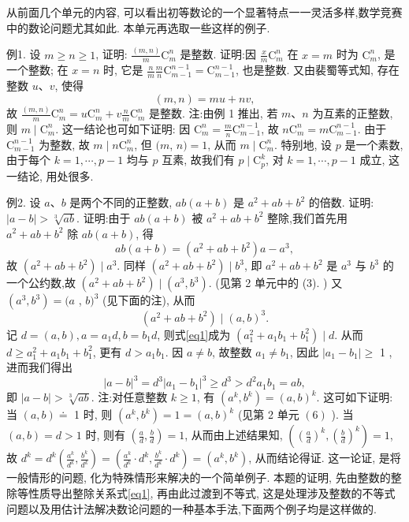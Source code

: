 
从前面几个单元的内容, 可以看出初等数论的一个显著特点一一灵活多样,数学竞赛中的数论问题尤其如此.
本单元再选取一些这样的例子.



例1. 设 $m \geqslant n \geqslant 1$, 证明: $\frac{(m, n)}{m} \mathrm{C}_m^n$ 是整数.
证明:因 $\frac{x}{m} \mathrm{C}_m^n$ 在 $x=m$ 时为 $\mathrm{C}_m^n$, 是一个整数; 在 $x=n$ 时, 它是 $\frac{n}{m} \frac{m}{n} \mathrm{C}_{m-1}^{n-1}=\mathrm{C}_{m-1}^{n-1}$, 也是整数.
又由裴蜀等式知, 存在整数 $u 、 v$, 使得
$$
(m, n)=m u+n v,
$$
故 $\frac{(m, n)}{m} \mathrm{C}_m^n=u \mathrm{C}_m^n+v \frac{n}{m} \mathrm{C}_m^n$ 是整数.
注:由例 1 推出, 若 $m 、 n$ 为互素的正整数,则 $m \mid \mathrm{C}_m^n$. 这一结论也可如下证明: 因 $\mathrm{C}_m^n=\frac{m}{n} \mathrm{C}_{m-1}^{n-1}$, 故 $n \mathrm{C}_m^n=m \mathrm{C}_{m-1}^{n-1}$. 由于 $\mathrm{C}_{m-1}^{n-1}$ 为整数, 故 $m \mid n \mathrm{C}_m^n$, 但 $(m$, $n)=1$, 从而 $m \mid \mathrm{C}_m^n$.
特别地, 设 $p$ 是一个素数, 由于每个 $k=1, \cdots, p-1$ 均与 $p$ 互素, 故我们有 $p \mid \mathrm{C}_p^k$, 对 $k=1, \cdots, p-1$ 成立, 这一结论, 用处很多.



例2. 设 $a 、 b$ 是两个不同的正整数, $a b(a+b)$ 是 $a^2+a b+b^2$ 的倍数.
证明: $|a-b|>\sqrt[3]{a b}$.
证明:由于 $a b(a+b)$ 被 $a^2+a b+b^2$ 整除,我们首先用 $a^2+a b+b^2$ 除 $a b(a+b)$, 得
$$
a b(a+b)=\left(a^2+a b+b^2\right) a-a^3,
$$
故 $\left(a^2+a b+b^2\right) \mid a^3$. 同样 $\left(a^2+a b+b^2\right) \mid b^3$, 即 $a^2+a b+b^2$ 是 $a^3$ 与 $b^3$ 的一个公约数,故 $\left(a^2+a b+b^2\right) \mid\left(a^3, b^3\right)$. (见第 2 单元中的 (3). ) 又 $\left(a^3, b^3\right)=(a$ , $b)^3$ (见下面的注), 从而
$$
\left(a^2+a b+b^2\right) \mid(a, b)^3 . \label{eq1}
$$
记 $d=(a, b), a=a_1 d, b=b_1 d$, 则式\ref{eq1}成为 $\left(a_1^2+a_1 b_1+b_1^2\right) \mid d$. 从而 $d \geqslant a_1^2+a_1 b_1+b_1^2$, 更有 $d>a_1 b_1$. 因 $a \neq b$, 故整数 $a_1 \neq b_1$, 因此 $\left|a_1-b_1\right| \geqslant$ 1 , 进而我们得出
$$
|a-b|^3=d^3\left|a_1-b_1\right|^3 \geqslant d^3>d^2 a_1 b_1=a b,
$$
即 $|a-b|>\sqrt[3]{a b}$.
注:对任意整数 $k \geqslant 1$, 有 $\left(a^k, b^k\right)=(a, b)^k$. 这可如下证明: 当 $(a, b) \doteq$ 1 时, 则 $\left(a^k, b^k\right)=1=(a, b)^k$ (见第 2 单元 $(6)$ ). 当 $(a, b)=d>1$ 时, 则有 $\left(\frac{a}{d}, \frac{b}{d}\right)=1$, 从而由上述结果知, $\left(\left(\frac{a}{d}\right)^k,\left(\frac{b}{d}\right)^k\right)=1$, 故 $d^k= d^k\left(\frac{a^k}{d^k}, \frac{b^k}{d^k}\right)=\left(\frac{a^k}{d^k} \cdot d^k, \frac{b^k}{d^k} \cdot d^k\right)=\left(a^k, b^k\right)$, 从而结论得证.
这一论证, 是将一般情形的问题, 化为特殊情形来解决的一个简单例子.
本题的证明, 先由整数的整除等性质导出整除关系式\ref{eq1}, 再由此过渡到不等式, 这是处理涉及整数的不等式问题以及用估计法解决数论问题的一种基本手法,下面两个例子均是这样做的.



